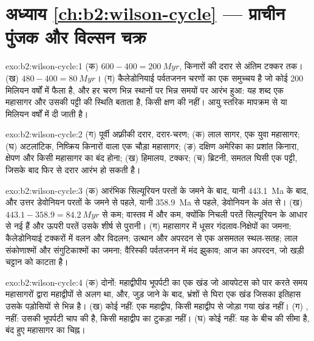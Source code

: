 \section*{अध्याय \ref{ch:b2:wilson-cycle} --- प्राचीन पुंजक और विल्सन चक्र}

\begin{solution}{exo:b2:wilson-cycle:1}
(क) $600 - 400 = \qty{200}{Myr}$, किनारों की दरार से अंतिम टक्कर तक।
(ख) $480 - 400 = \qty{80}{Myr}$। (ग) कैलेडोनियाई पर्वतजनन चरणों का एक समुच्चय है जो
कोई 200 मिलियन वर्षों में फैला है, और हर चरण भिन्न स्थानों पर भिन्न समयों पर आरंभ हुआ: यह शब्द
एक महासागर और उसकी पट्टी की स्थिति बताता है, किसी क्षण की नहीं। आयु स्तरिक मापक्रम से या
मिलियन वर्षों में दी जाती है।
\end{solution}

\begin{solution}{exo:b2:wilson-cycle:2}
(ग) पूर्वी अफ़्रीकी दरार, दरार-चरण; (क) लाल सागर, एक युवा महासागर; (घ) अटलांटिक, निष्क्रिय किनारों वाला एक चौड़ा
महासागर; (ङ) दक्षिण अमेरिका का प्रशांत किनारा, क्षेपण और किसी महासागर का
बंद होना; (ख) हिमालय, टक्कर; (च) ब्रिटनी, समतल घिसी एक पट्टी, जिसके बाद
फिर से दरार आरंभ हो सकती है।
\end{solution}

\begin{solution}{exo:b2:wilson-cycle:3}
(क) आरंभिक सिल्यूरियन परतों के जमने के बाद, यानी \qty{443.1}{Ma} के बाद, और
उत्तर डेवोनियन परतों के जमने से पहले, यानी \qty{358.9}{Ma} से पहले, डेवोनियन के अंत से।
(ख) $443.1 - 358.9 = \qty{84.2}{Myr}$ से कम; वास्तव में और कम, क्योंकि निचली परतें
सिल्यूरियन के आधार से नई हैं और ऊपरी परतें उसके शीर्ष से पुरानी। (ग) महासागर में
धूसर गंदलाव-निक्षेपों का जमना; कैलेडोनियाई टक्करों में वलन और विदलन; उत्थान और
अपरदन से एक असमतल स्थल-सतह; लाल संकोणाश्मों और संगुटिकाश्मों का जमना; वैरिस्की पर्वतजनन में मंद
झुकाव; आज का अपरदन, जो खड़ी चट्टान को काटता है।
\end{solution}

\begin{solution}{exo:b2:wilson-cycle:4}
(क) दोनों: महाद्वीपीय भूपर्पटी का एक खंड जो आयपेटस को पार करते समय महासागरों द्वारा महाद्वीपों से अलग था,
और, जुड़ जाने के बाद, भ्रंशों से घिरा एक खंड जिसका इतिहास उसके
पड़ोसियों से भिन्न है। (ख) कोई नहीं: एक महाद्वीप, किसी महाद्वीप से जोड़ा गया खंड नहीं। (ग) , 
नहीं: उसकी भूपर्पटी चाप की है, किसी महाद्वीप का टुकड़ा नहीं। (घ) कोई नहीं: यह
 के बीच की सीमा है, बंद हुए महासागर का चिह्न।
\end{solution}

